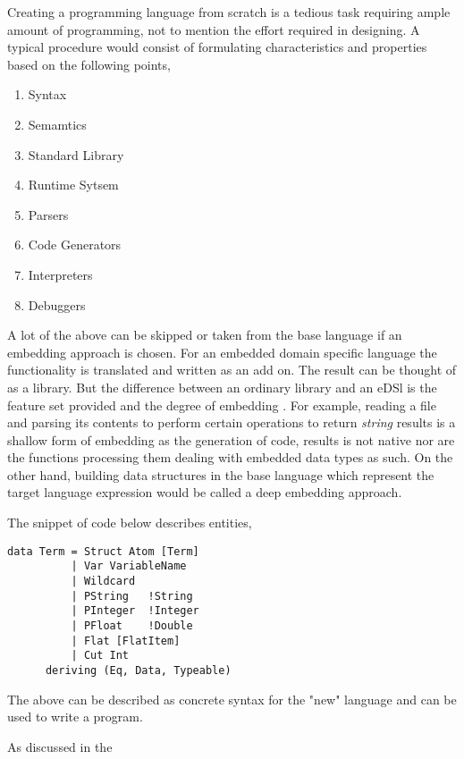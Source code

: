 \documentclass[thesis-solanki.tex]{subfiles}
\begin{document}
Creating a programming language from scratch is a tedious task requiring ample amount of programming, not to mention the effort required in 
designing. A typical procedure would consist of formulating characteristics and properties based on the following points,

\begin{enumerate}
\item Syntax
\item Semamtics
\item Standard Library
\item Runtime Sytsem
\item Parsers
\item Code Generators
\item Interpreters
\item Debuggers
\end{enumerate}

A lot of the above can be skipped or taken from the base language if an embedding approach is chosen. For an embedded domain specific 
language the functionality is translated and written as an add on. The result can be thought of as a library. But the  
difference between an ordinary library and an eDSl is the feature set provided and the degree of embedding 
\cite{website:eDSLhaskellwiki}. For example, reading a file and parsing its contents to perform certain operations to return 
\textit{string} results is a shallow form of embedding as the generation of code, results is not native nor are the functions processing 
them dealing with embedded data types as such. On the other hand, building data structures in the base language which represent the 
target language expression would be called a deep embedding approach.         

\par The snippet of  code below describes  entities,

\begin{verbatim}
data Term = Struct Atom [Term]
          | Var VariableName
          | Wildcard
          | PString   !String
          | PInteger  !Integer
          | PFloat    !Double
          | Flat [FlatItem]
          | Cut Int
      deriving (Eq, Data, Typeable)
\end{verbatim}

The above can be described as concrete syntax for the "new" language and can be used to write a program.  


As discussed in the 
\end{document}

